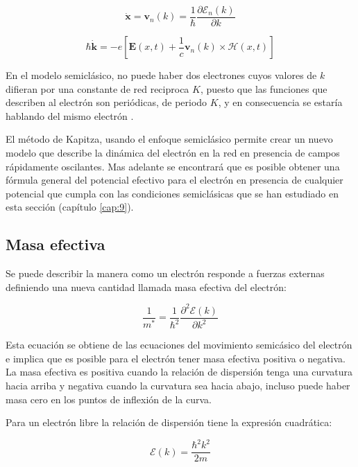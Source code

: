 \begin{equation}\label{eq:7.1}
    \dot{\textbf{x}}=\textbf{v}_n(k)=\frac{1}{\hbar}\frac{\partial \mathcal{E}_n(k)}{\partial k}
\end{equation}

\begin{equation}\label{eq:7.2}
    \hbar\dot{\textbf{k}}=-e\left[\textbf{E}(x,t)+\frac{1}{c}\textbf{v}_n(k)\times \mathcal{H}(x,t)\right]
\end{equation}

En el modelo semiclásico, no puede haber dos electrones cuyos valores de $k$ difieran por una constante de red reciproca $K$, puesto que las funciones que describen al electrón son periódicas, de periodo $K$, y en consecuencia se estaría hablando del mismo electrón \cite{ashc}.

El método de Kapitza, usando el enfoque semiclásico permite crear un nuevo modelo que describe la dinámica del electrón en la red en presencia de campos rápidamente oscilantes. Mas adelante se encontrará que es posible obtener una fórmula general del potencial efectivo para el electrón en presencia de cualquier potencial que cumpla con las condiciones semiclásicas que se han estudiado en esta sección (capítulo \ref{cap:9}).

\subsection{Masa efectiva}

Se puede describir la manera como un electrón responde a fuerzas externas definiendo una nueva cantidad llamada masa efectiva del electrón:

\begin{equation}\label{eq:7.3}
    \frac{1}{m^*}=\frac{1}{\hbar^2}\frac{\partial^2 \mathcal{E}(k)}{\partial k^2}
\end{equation}

Esta ecuación se obtiene de las ecuaciones del movimiento semicásico del electrón
e implica que es posible para el electrón tener masa efectiva positiva o negativa. La masa efectiva es positiva cuando la relación de dispersión tenga una curvatura hacia arriba y negativa cuando la curvatura sea hacia abajo, incluso puede haber masa cero en los puntos de inflexión de la curva.

Para un electrón libre la relación de dispersión tiene la expresión cuadrática:

\begin{equation}\label{eq:7.4}
    \mathcal{E}(k)=\frac{\hbar^2k^2}{2m}
\end{equation}

